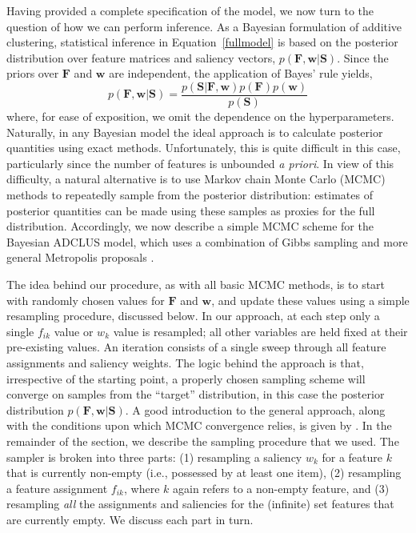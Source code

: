 \documentclass[11pt]{article}
\newcommand{\condon}{|}
\begin{document}
Having provided a complete specification of the model, we now turn to the question of how we can perform inference. As a Bayesian formulation of additive clustering, statistical inference in Equation~\ref{fullmodel} is based on the posterior distribution over feature matrices and saliency vectors, $p(\mathbf{F}, \mathbf{w} \condon \mathbf{S})$. Since the priors over $\mathbf{F}$ and $\mathbf{w}$ are independent, the application of Bayes' rule yields,
	\begin{equation}
	p(\mathbf{F}, \mathbf{w} \condon \mathbf{S}) = \frac{p(\mathbf{S} \condon \mathbf{F}, \mathbf{w})
	p(\mathbf{F}) p(\mathbf{w})}{p(\mathbf{S})}
	\end{equation}
where, for ease of exposition, we omit the dependence on the hyperparameters. Naturally, in any Bayesian model the ideal approach is to calculate posterior quantities using exact methods. Unfortunately, this is quite difficult in this case, particularly since the number of features is unbounded {\it a priori}. In view of this difficulty, a natural alternative is to use Markov chain Monte Carlo (MCMC) methods to repeatedly sample from the posterior distribution: estimates of posterior quantities can be made using these samples as proxies for the full distribution. Accordingly, we now describe a simple MCMC scheme for the Bayesian ADCLUS model, which uses a combination of Gibbs sampling \cite{gemang84} and more general Metropolis proposals \cite{metropolis53}.

The idea behind our procedure, as with all basic MCMC methods, is to start with randomly chosen values for $\mathbf{F}$ and $\mathbf{w}$, and update these values using a simple resampling procedure, discussed below. In our approach, at each step only a single $f_{ik}$ value or $w_k$ value is resampled; all other variables are held fixed at their pre-existing values. An iteration consists of a single sweep through all feature assignments and saliency weights. The logic behind the approach is that, irrespective of the starting point, a properly chosen sampling scheme will converge on samples from the ``target'' distribution, in this case the posterior distribution $p(\mathbf{F}, \mathbf{w} \condon \mathbf{S})$. A good introduction to the general approach, along with the conditions upon which MCMC convergence relies, is given by . In the remainder of the section, we describe the sampling procedure that we used. The sampler is broken into three parts: (1) resampling a saliency $w_k$ for a feature $k$ that is currently non-empty (i.e., possessed by at least one item), (2) resampling a feature assignment $f_{ik}$, where $k$ again refers to a non-empty feature, and (3) resampling {\it all} the assignments and saliencies for the (infinite) set features that are currently empty. We discuss each part in turn.
\end{document}
